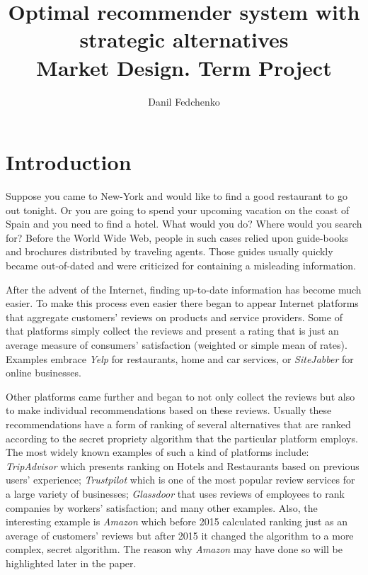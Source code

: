 \documentclass[a4paper]{article}
\title{Optimal recommender system with strategic alternatives \\ Market Design. Term Project}
\date{}
\author{Danil Fedchenko}
\begin{document}
	\maketitle
	\section{Introduction}
	Suppose you came to New-York and would like to find a good restaurant to go out tonight. Or you are going to spend your upcoming vacation on the coast of Spain and you need to find a hotel. What would you do? Where would you search for?  Before the World Wide Web, people in such cases relied upon guide-books and brochures distributed by traveling agents. Those guides usually quickly became out-of-dated and were criticized for containing a misleading information. 
	
	
	
	
	
	After the advent of the Internet, finding up-to-date information has become much easier. To make this process even easier there began to appear Internet platforms that aggregate customers' reviews on products and service providers. Some of that platforms simply collect the reviews and present a rating that is just an average measure of consumers' satisfaction (weighted or simple mean of rates). Examples embrace \textit{Yelp} for restaurants, home and car services, or \textit{SiteJabber} for online businesses.
	
	
	
	
	
	 Other platforms came further and began to not only collect the reviews but also to make individual recommendations based on these reviews. Usually these recommendations have a form of ranking of several alternatives that are ranked according to the secret propriety algorithm that the particular platform employs. The most widely known examples of such a kind of platforms include: \textit{TripAdvisor} which presents ranking on Hotels and Restaurants based on previous users' experience; \textit{Trustpilot} which is one of the most popular review services for a large variety of businesses; \textit{Glassdoor} that uses reviews of employees to rank companies by workers' satisfaction; and many other examples. Also, the interesting example is \textit{Amazon} which before 2015 calculated ranking just as an average of customers' reviews but after 2015 it changed the algorithm to a more complex, secret algorithm. The reason why \textit{Amazon} may have done so will be highlighted later in the paper. 
	 
\end{document}
